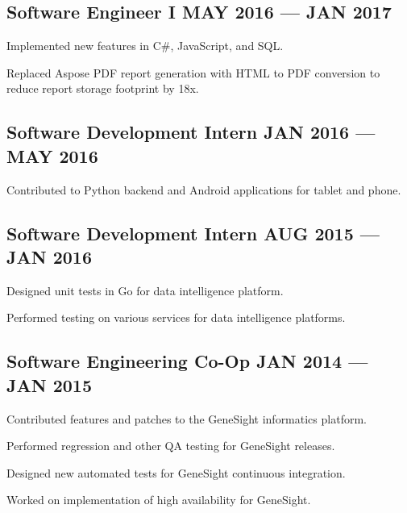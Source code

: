 \subsection{{Software Engineer I \hfill MAY 2016 --- JAN 2017}}
\begin{zitemize}
\item Implemented new features in C\#, JavaScript, and SQL.
\item Replaced Aspose PDF report generation with HTML to PDF conversion to reduce report storage footprint by 18x.
\end{zitemize}

\subsection{{Software Development Intern \hfill JAN 2016 --- MAY 2016}}
\begin{zitemize}
\item Contributed to Python backend and Android applications for tablet and phone.
\end{zitemize}

\subsection{{Software Development Intern \hfill AUG 2015 --- JAN 2016}}
\begin{zitemize}
\item Designed unit tests in Go for data intelligence platform.
\item Performed testing on various services for data intelligence platforms.
\end{zitemize}

\subsection{{Software Engineering Co-Op \hfill JAN 2014 --- JAN 2015}}
\begin{zitemize}
\item Contributed features and patches to the GeneSight informatics platform.
\item Performed regression and other QA testing for GeneSight releases.
\item Designed new automated tests for GeneSight continuous integration.
\item Worked on implementation of high availability for GeneSight.
\end{zitemize}

